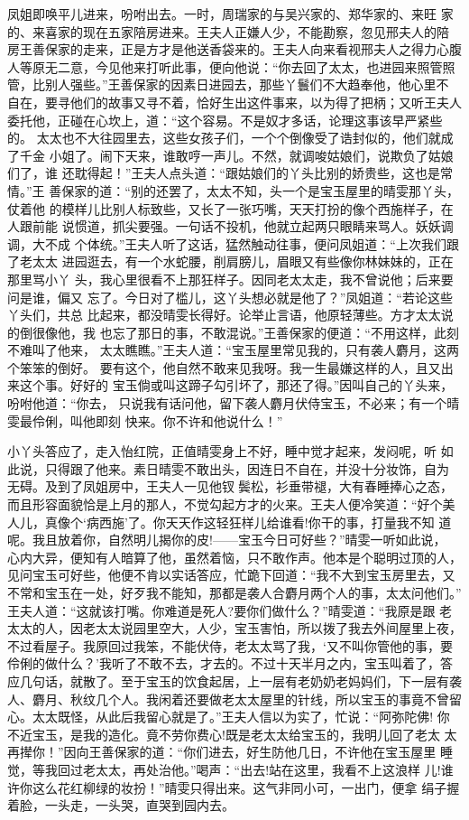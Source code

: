 凤姐即唤平儿进来，吩咐出去。一时，周瑞家的与吴兴家的、郑华家的、来旺
家的、来喜家的现在五家陪房进来。王夫人正嫌人少，不能勘察，忽见邢夫人的陪
房王善保家的走来，正是方才是他送香袋来的。王夫人向来看视邢夫人之得力心腹
人等原无二意，今见他来打听此事，便向他说：“你去回了太太，也进园来照管照
管，比别人强些。”王善保家的因素日进园去，那些丫鬟们不大趋奉他，他心里不
自在，要寻他们的故事又寻不着，恰好生出这件事来，以为得了把柄；又听王夫人
委托他，正碰在心坎上，道：“这个容易。不是奴才多话，论理这事该早严紧些的。
太太也不大往园里去，这些女孩子们，一个个倒像受了诰封似的，他们就成了千金
小姐了。闹下天来，谁敢哼一声儿。不然，就调唆姑娘们，说欺负了姑娘们了，谁
还耽得起！”王夫人点头道：“跟姑娘们的丫头比别的娇贵些，这也是常情。”王
善保家的道：“别的还罢了，太太不知，头一个是宝玉屋里的晴雯那丫头，仗着他
的模样儿比别人标致些，又长了一张巧嘴，天天打扮的像个西施样子，在人跟前能
说惯道，抓尖要强。一句话不投机，他就立起两只眼睛来骂人。妖妖调调，大不成
个体统。”王夫人听了这话，猛然触动往事，便问凤姐道：“上次我们跟了老太太
进园逛去，有一个水蛇腰，削肩膀儿，眉眼又有些像你林妹妹的，正在那里骂小丫
头，我心里很看不上那狂样子。因同老太太走，我不曾说他；后来要问是谁，偏又
忘了。今日对了槛儿，这丫头想必就是他了？”凤姐道：“若论这些丫头们，共总
比起来，都没晴雯长得好。论举止言语，他原轻薄些。方才太太说的倒很像他，我
也忘了那日的事，不敢混说。”王善保家的便道：“不用这样，此刻不难叫了他来，
太太瞧瞧。”王夫人道：“宝玉屋里常见我的，只有袭人麝月，这两个笨笨的倒好。
要有这个，他自然不敢来见我呀。我一生最嫌这样的人，且又出来这个事。好好的
宝玉倘或叫这蹄子勾引坏了，那还了得。”因叫自己的丫头来，吩咐他道：“你去，
只说我有话问他，留下袭人麝月伏侍宝玉，不必来；有一个晴雯最伶俐，叫他即刻
快来。你不许和他说什么！”

小丫头答应了，走入怡红院，正值晴雯身上不好，睡中觉才起来，发闷呢，听
如此说，只得跟了他来。素日晴雯不敢出头，因连日不自在，并没十分妆饰，自为
无碍。及到了凤姐房中，王夫人一见他钗鬓松，衫垂带褪，大有春睡捧心之态，
而且形容面貌恰是上月的那人，不觉勾起方才的火来。王夫人便冷笑道：“好个美
人儿，真像个‘病西施’了。你天天作这轻狂样儿给谁看!你干的事，打量我不知
道呢。我且放着你，自然明儿揭你的皮!——宝玉今日可好些？”晴雯一听如此说，
心内大异，便知有人暗算了他，虽然着恼，只不敢作声。他本是个聪明过顶的人，
见问宝玉可好些，他便不肯以实话答应，忙跪下回道：“我不大到宝玉房里去，又
不常和宝玉在一处，好歹我不能知，那都是袭人合麝月两个人的事，太太问他们。”
王夫人道：“这就该打嘴。你难道是死人?要你们做什么？”晴雯道：“我原是跟
老太太的人，因老太太说园里空大，人少，宝玉害怕，所以拨了我去外间屋里上夜，
不过看屋子。我原回过我笨，不能伏侍，老太太骂了我，‘又不叫你管他的事，要
伶俐的做什么？’我听了不敢不去，才去的。不过十天半月之内，宝玉叫着了，答
应几句话，就散了。至于宝玉的饮食起居，上一层有老奶奶老妈妈们，下一层有袭
人、麝月、秋纹几个人。我闲着还要做老太太屋里的针线，所以宝玉的事竟不曾留
心。太太既怪，从此后我留心就是了。”王夫人信以为实了，忙说：“阿弥陀佛!
你不近宝玉，是我的造化。竟不劳你费心!既是老太太给宝玉的，我明儿回了老太
太再撵你！”因向王善保家的道：“你们进去，好生防他几日，不许他在宝玉屋里
睡觉，等我回过老太太，再处治他。”喝声：“出去!站在这里，我看不上这浪样
儿!谁许你这么花红柳绿的妆扮！”晴雯只得出来。这气非同小可，一出门，便拿
绢子握着脸，一头走，一头哭，直哭到园内去。

